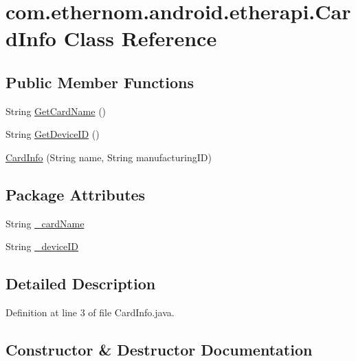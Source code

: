 \hypertarget{classcom_1_1ethernom_1_1android_1_1etherapi_1_1_card_info}{}\section{com.\+ethernom.\+android.\+etherapi.\+Card\+Info Class Reference}
\label{classcom_1_1ethernom_1_1android_1_1etherapi_1_1_card_info}
\subsection*{Public Member Functions}
\begin{DoxyCompactItemize}
\item 
String \mbox{\hyperlink{classcom_1_1ethernom_1_1android_1_1etherapi_1_1_card_info_a2bf8528f0d4058a8fbd7d59acbd9d065}{Get\+Card\+Name}} ()
\item 
String \mbox{\hyperlink{classcom_1_1ethernom_1_1android_1_1etherapi_1_1_card_info_af56039cd0223acddde740b8518b4a454}{Get\+Device\+ID}} ()
\item 
\mbox{\hyperlink{classcom_1_1ethernom_1_1android_1_1etherapi_1_1_card_info_a238bab6cc173acfa24986bfe9be0d5a8}{Card\+Info}} (String name, String manufacturing\+ID)
\end{DoxyCompactItemize}
\subsection*{Package Attributes}
\begin{DoxyCompactItemize}
\item 
String \mbox{\hyperlink{classcom_1_1ethernom_1_1android_1_1etherapi_1_1_card_info_a503aeab1d921778a53c1769abeb559fa}{\+\_\+card\+Name}}
\item 
String \mbox{\hyperlink{classcom_1_1ethernom_1_1android_1_1etherapi_1_1_card_info_afa93a69a94c31798c5780c4be71ab86d}{\+\_\+device\+ID}}
\end{DoxyCompactItemize}


\subsection{Detailed Description}


Definition at line 3 of file Card\+Info.\+java.



\subsection{Constructor \& Destructor Documentation}
\mbox{\label{classcom_1_1ethernom_1_1android_1_1etherapi_1_1_card_info_a238bab6cc173acfa24986bfe9be0d5a8}} 
